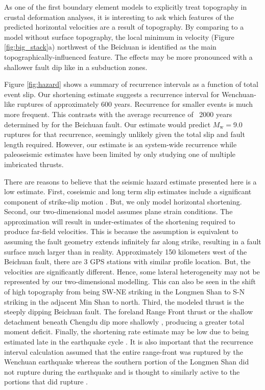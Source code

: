 \documentclass[12pt]{article}
\begin{document}
As one of the first boundary element models to explicitly treat topography in crustal deformation analyses, it is interesting to ask which features of the predicted horizontal velocities are a result of topography. By comparing to a model without surface topography, the local minimum in velocity (Figure \ref{fig:big_stack}a) northwest of the Beichuan is identified as the main topographically-influenced feature. The effects may be more pronounced with a shallower fault dip like in a subduction zones.

Figure \ref{fig:hazard} shows a summary of recurrence intervals as a function of total event slip. Our shortening estimate suggests a recurrence interval for Wenchuan-like ruptures of approximately 600 years. Recurrence for smaller events is much more frequent. This contrasts with the average recurrence of ~2000 years determined by \citep{Ran2010} for the Beichuan fault. Our estimate would predict $M_{\textrm{w}} = $9.0 ruptures for that recurrence, seemingly unlikely given the total slip and fault length required. However, our estimate is an system-wide recurrence while paleoseismic estimates have been limited by only studying one of multiple imbricated thrusts. 

There are reasons to believe that the seismic hazard estimate presented here is a low estimate.  First, coseismic and long term slip estimates include a significant component of strike-slip motion\citep{Shen2009, Qi2011, Densmore2007} . But, we only model horizontal shortening. Second, our two-dimensional model assumes plane strain conditions. The approximation will result in under-estimates of the shortening required to produce far-field velocities. This is because the assumption is equivalent to assuming the fault geometry extends infinitely far along strike, resulting in a fault surface much larger than in reality. Approximately 150 kilometers west of the Beichuan fault, there are 3 GPS stations with similar profile location. But, the velocities are significantly different. Hence, some lateral heterogeneity may not be represented by our two-dimensional modelling. This can also be seen in the shift of high topography from being SW-NE striking in the Longmen Shan to S-N striking in the adjacent Min Shan to north. Third, the modeled thrust is the steeply dipping Beichuan fault. The foreland Range Front thrust or the shallow detachment beneath Chengdu dip more shallowly \citep{Hubbard2010}, producing a greater total moment deficit.  Finally, the shortening rate estimate may be low due to being estimated late in the earthquake cycle \citep{savage00}.  It is also important that the recurrence interval calculation assumed that the entire range-front was ruptured by the Wenchuan earthquake whereas the southern portion of the Longmen Shan did not rupture during the earthquake and is thought to similarly active to the portions that did rupture \citep{Li2010}. 
\end{document}
